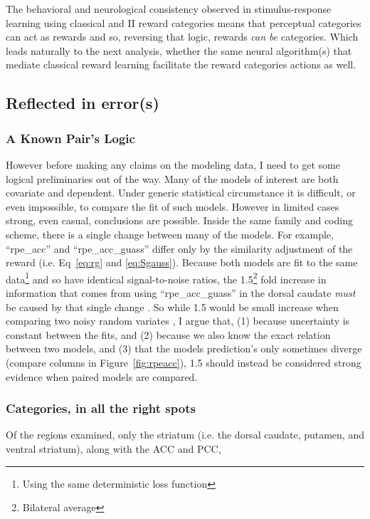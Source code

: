 \documentclass[doc,12pt]{apa}        %
\begin{document}
The behavioral and neurological consistency observed in stimulus-response learning using classical and II reward categories means that perceptual categories can act as rewards and so, reversing that logic, rewards \emph{can be} categories.   Which leads naturally to the next analysis, whether the same neural algorithm(s) that mediate classical reward learning facilitate the reward categories actions as well.

\subsection{Reflected in error(s)}
\label{sub:inerror}
\subsubsection{A Known Pair's Logic}
\label{subsub:onestep}
However before making any claims on the modeling data, I need to get some logical preliminaries out of the way.  Many of the models of interest are both covariate and dependent.  Under generic statistical circumstance it is difficult, or even impossible, to compare the fit of such models.  However in limited cases strong, even casual, conclusions are possible.   Inside the same family and coding scheme, there is a single change between many of the models.  For example, ``rpe\_acc'' and ``rpe\_acc\_guass'' differ only by the similarity adjustment of the reward (i.e. Eq~\ref{eq:rg} and \ref{eq:Sgauss}).  Because both models are fit to the same data\footnote{Using the same deterministic loss function} and so have identical signal-to-noise ratios, the 1.5\footnote{Bilateral average} fold increase in information that comes from using ``rpe\_acc\_guass'' in the dorsal caudate \emph{must} be caused by that single change \cite{Pearl:2010p9726}.  So while 1.5 would be small increase when comparing two noisy random variates \cite{Anderson:2000p9475,Forster:2000p9623}, I argue that, (1) because uncertainty is constant between the fits, and (2) because we also know the exact relation between two models, and (3) that the models prediction's only sometimes diverge (compare columns in Figure~\ref{fig:rpeacc}), 1.5 should instead be considered strong evidence when paired models are compared.

\subsubsection{Categories, in all the right spots}
\label{subsub:rightspots}
Of the regions examined, only the striatum (i.e. the dorsal caudate, putamen, and ventral striatum), along with the ACC and PCC, 
 
\end{document}
